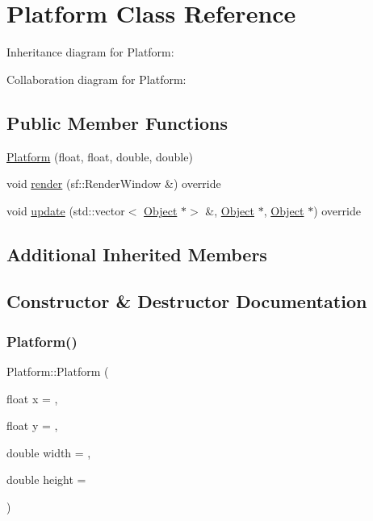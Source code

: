 \hypertarget{classPlatform}{}\section{Platform Class Reference}
\label{classPlatform}


Inheritance diagram for Platform\+:


Collaboration diagram for Platform\+:
\subsection*{Public Member Functions}
\begin{DoxyCompactItemize}
\item 
\hyperlink{classPlatform_ac71b0eea8af0c2393a6fe28522b1b3b4}{Platform} (float, float, double, double)
\item 
void \hyperlink{classPlatform_a2b9b802b95f49d2862ed33aac05dcd5c}{render} (sf\+::\+Render\+Window \&) override
\item 
void \hyperlink{classPlatform_af4288367c167c4cdecf93070b7a5d464}{update} (std\+::vector$<$ \hyperlink{classObject}{Object} $\ast$$>$ \&, \hyperlink{classObject}{Object} $\ast$, \hyperlink{classObject}{Object} $\ast$) override
\end{DoxyCompactItemize}
\subsection*{Additional Inherited Members}


\subsection{Constructor \& Destructor Documentation}
\mbox{\label{classPlatform_ac71b0eea8af0c2393a6fe28522b1b3b4}} 
\subsubsection{\texorpdfstring{Platform()}{Platform()}}
{\footnotesize\ttfamily Platform\+::\+Platform (\begin{DoxyParamCaption}\item[{float}]{x = {},  }\item[{float}]{y = {},  }\item[{double}]{width = {},  }\item[{double}]{height = {} }\end{DoxyParamCaption})}

